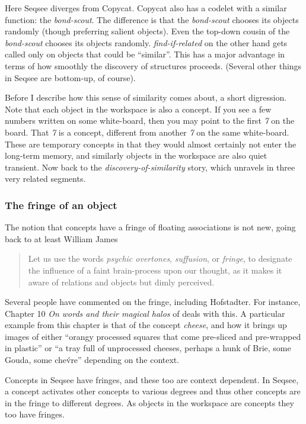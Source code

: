 \documentclass[letterpaper]{article}
\begin{document}
Here Seqsee diverges from Copycat.  Copycat also has a codelet with a similar function: the \emph{bond-scout}.  The difference is that the \emph{bond-scout} chooses its objects randomly (though preferring salient objects).  Even the top-down cousin of the \emph{bond-scout} chooses its objects randomly.  \emph{find-if-related} on the other hand gets called only on objects that could be ``similar''.  This has a major advantage in terms of how smoothly the discovery of structures proceeds.  (Several other things in Seqsee are bottom-up, of course).

Before I describe how this sense of similarity comes about, a short digression. Note that each object in the workspace is also a concept.  If you see a few numbers written on some white-board, then you may point to the first \emph{7} on the board.  That \emph{7} is a concept, different from another \emph{7} on the same white-board.  These are temporary concepts in that they would almost certainly not enter the long-term memory, and similarly objects in the workspace are also quiet transient. Now back to the \emph{discovery-of-similarity} story, which unravels in three very related segments.

\subsubsection{The fringe of an object}
\label{sec:fringe}

The notion that concepts have a fringe of floating associations is not new, going back to at least William James \cite{James}

\begin{quote}
  Let us use the words \emph{psychic overtones}, \emph{suffusion}, or \emph{fringe}, to designate the influence of a faint brain-process upon our thought, as it makes it aware of relations and objects but dimly perceived.
\end{quote}

  Several people have commented on the fringe, including Hofstadter.  For instance, Chapter 10 \emph{On words and their magical halos} of  deals with this.  A particular example from this chapter is that of the concept \emph{cheese}, and how it brings up images of either ``orangy processed squares that come pre-sliced and pre-wrapped in plastic'' or ``a tray full of unprocessed cheeses, perhaps a hunk of Brie, some Gouda, some che\'vre'' depending on the context.

Concepts in Seqsee have fringes, and these too are context dependent. In Seqsee, a concept activates other concepts to various degrees and thus other concepts are in the fringe to different degrees. As objects in the workspace are concepts they too have fringes.
\end{document}
